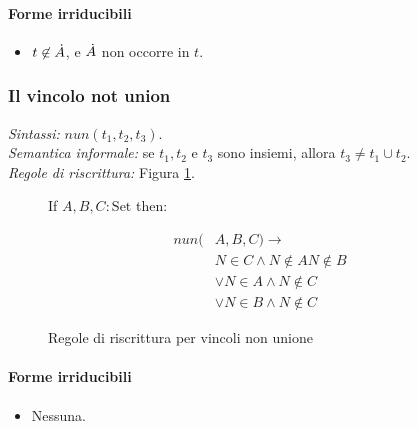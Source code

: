 \documentclass[12pt,a4paper,openright]{book}  %
\begin{document}
\paragraph{Forme irriducibili}
\begin{itemize}
	\item $t \not\in \dot{A}$, e $\dot{A}$ non occorre in $t$.
\end{itemize}


\subsubsection{Il vincolo not union}

\textit{Sintassi:} $nun(t_1,t_2,t_3)$.\\
\noindent\textit{Semantica informale:} se $t_1, t_2$ e $t_3$ sono insiemi, allora $t_3 \neq t_1 \cup t_2$.\\
\noindent\textit{Regole di riscrittura:} Figura \ref{fig:notun_constraints}.

\begin{figure}
	\begin{tcolorbox}[colframe=black, colback=white, sharp corners]
		\setcounter{equation}{13}
		\renewcommand{\theequation}{$\cup$\textsubscript{\arabic{equation}}}

		If $A, B, C: \text{Set}$ then:

		\begin{equation}
		\begin{split}
		nun(& A,B,C) \to \\
		  & N \in C \land N \not\in A N \not\in B \\
		  & \lor N \in A \land N \not\in C \\
		  & \lor N \in B \land N \not\in C
		\end{split}
		\end{equation}

	\end{tcolorbox}

	\caption{Regole di riscrittura per vincoli non unione}
	\label{fig:notun_constraints}
\end{figure}

\paragraph{Forme irriducibili}
\begin{itemize}
	\item Nessuna.
\end{itemize}
\end{document}
